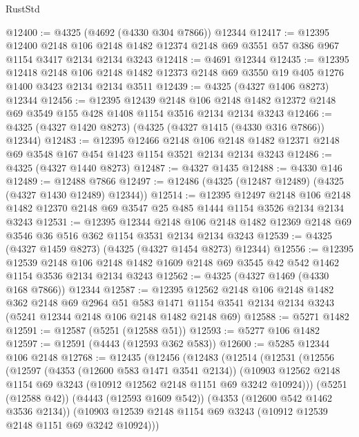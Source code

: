 \begin{lexlean}{RustStd}
\begin{coremodule}
@12400 := @4325 (@4692 (@4330 @304 @7866)) @12344
@12417 := @12395
    @12400
    @2148
    @106
    @2148
    @1482
    @12374
    @2148
    @69
    @3551
    @57
    @386
    @967
    @1154
    @3417
    @2134
    @2134
    @3243
@12418 := @4691 @12344
@12435 := @12395
    @12418
    @2148
    @106
    @2148
    @1482
    @12373
    @2148
    @69
    @3550
    @19
    @405
    @1276
    @1400
    @3423
    @2134
    @2134
    @3511
@12439 := @4325 (@4327 @1406 @8273) @12344
@12456 := @12395
    @12439
    @2148
    @106
    @2148
    @1482
    @12372
    @2148
    @69
    @3549
    @155
    @428
    @1408
    @1154
    @3516
    @2134
    @2134
    @3243
@12466 := @4325 (@4327 @1420 @8273) (@4325 (@4327 @1415 (@4330 @316 @7866)) @12344)
@12483 := @12395
    @12466
    @2148
    @106
    @2148
    @1482
    @12371
    @2148
    @69
    @3548
    @167
    @454
    @1423
    @1154
    @3521
    @2134
    @2134
    @3243
@12486 := @4325 (@4327 @1440 @8273)
@12487 := @4327 @1435
@12488 := @4330 @146
@12489 := @12488 @7866
@12497 := @12486 (@4325 (@12487 @12489) (@4325 (@4327 @1430 @12489) @12344))
@12514 := @12395
    @12497
    @2148
    @106
    @2148
    @1482
    @12370
    @2148
    @69
    @3547
    @25
    @485
    @1444
    @1154
    @3526
    @2134
    @2134
    @3243
@12531 := @12395
    @12344
    @2148
    @106
    @2148
    @1482
    @12369
    @2148
    @69
    @3546
    @36
    @516
    @362
    @1154
    @3531
    @2134
    @2134
    @3243
@12539 := @4325 (@4327 @1459 @8273) (@4325 (@4327 @1454 @8273) @12344)
@12556 := @12395
    @12539
    @2148
    @106
    @2148
    @1482
    @1609
    @2148
    @69
    @3545
    @42
    @542
    @1462
    @1154
    @3536
    @2134
    @2134
    @3243
@12562 := @4325 (@4327 @1469 (@4330 @168 @7866)) @12344
@12587 := @12395
    @12562
    @2148
    @106
    @2148
    @1482
    @362
    @2148
    @69
    @2964
    @51
    @583
    @1471
    @1154
    @3541
    @2134
    @2134
    @3243
    (@5241 @12344 @2148 @106 @2148 @1482 @2148 @69)
@12588 := @5271 @1482
@12591 := @12587 (@5251 (@12588 @51))
@12593 := @5277 @106 @1482
@12597 := @12591 (@4443 (@12593 @362 @583))
@12600 := @5285 @12344 @106 @2148
@12768 := @12435
    (@12456
      (@12483
        (@12514
          (@12531
            (@12556
              (@12597
                (@4353 (@12600 @583 @1471 @3541 @2134))
                (@10903 @12562 @2148 @1154 @69 @3243 (@10912 @12562 @2148 @1151 @69 @3242 @10924)))
              (@5251 (@12588 @42))
              (@4443 (@12593 @1609 @542))
              (@4353 (@12600 @542 @1462 @3536 @2134))
              (@10903 @12539 @2148 @1154 @69 @3243 (@10912 @12539 @2148 @1151 @69 @3242 @10924)))

\end{coremodule}
\end{lexlean}
